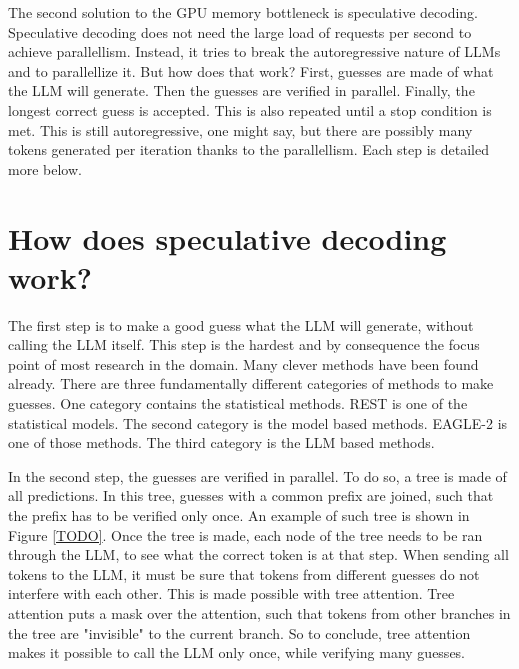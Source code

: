 The second solution to the GPU memory bottleneck is speculative decoding. Speculative decoding does not need the large load of requests per second to achieve parallellism. Instead, it tries to break the autoregressive nature of LLMs and to parallellize it. But how does that work? First, guesses are made of what the LLM will generate. Then the guesses are verified in parallel. Finally, the longest correct guess is accepted. This is also repeated until a stop condition is met. This is still autoregressive, one might say, but there are possibly many tokens generated per iteration thanks to the parallellism. Each step is detailed more below.

\section{How does speculative decoding work?}

The first step is to make a good guess what the LLM will generate, without calling the LLM itself. This step is the hardest and by consequence the focus point of most research in the domain. Many clever methods have been found already. There are three fundamentally different categories of methods to make guesses. One category contains the statistical methods. REST is one of the statistical models. The second category is the model based methods. EAGLE-2 is one of those methods. The third category is the LLM based methods.

In the second step, the guesses are verified in parallel. To do so, a tree is made of all predictions. In this tree, guesses with a common prefix are joined, such that the prefix has to be verified only once. An example of such tree is shown in Figure \ref{TODO}. Once the tree is made, each node of the tree needs to be ran through the LLM, to see what the correct token is at that step. When sending all tokens to the LLM, it must be sure that tokens from different guesses do not interfere with each other. This is made possible with tree attention. Tree attention puts a mask over the attention, such that tokens from other branches in the tree are "invisible" to the current branch. So to conclude, tree attention makes it possible to call the LLM only once, while verifying many guesses.

